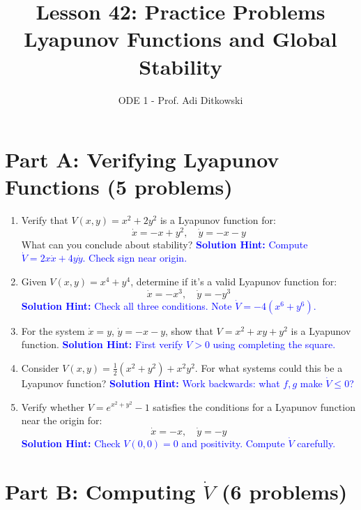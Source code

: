 \documentclass[12pt]{article}
\title{Lesson 42: Practice Problems\\
\large Lyapunov Functions and Global Stability}
\author{ODE 1 - Prof. Adi Ditkowski}
\date{}
\newcommand{\solution}[1]{\textcolor{blue}{\textbf{Solution Hint:} #1}}
\begin{document}
\maketitle

\section*{Part A: Verifying Lyapunov Functions (5 problems)}

\begin{enumerate}
\item Verify that $V(x,y) = x^2 + 2y^2$ is a Lyapunov function for:
$$\dot{x} = -x + y^2, \quad \dot{y} = -x - y$$
What can you conclude about stability?
\solution{Compute $\dot{V} = 2x\dot{x} + 4y\dot{y}$. Check sign near origin.}

\item Given $V(x,y) = x^4 + y^4$, determine if it's a valid Lyapunov function for:
$$\dot{x} = -x^3, \quad \dot{y} = -y^3$$
\solution{Check all three conditions. Note $\dot{V} = -4(x^6 + y^6)$.}

\item For the system $\dot{x} = y$, $\dot{y} = -x - y$, show that $V = x^2 + xy + y^2$ is a Lyapunov function.
\solution{First verify $V > 0$ using completing the square.}

\item Consider $V(x,y) = \frac{1}{2}(x^2 + y^2) + x^2y^2$. For what systems could this be a Lyapunov function?
\solution{Work backwards: what $f,g$ make $\dot{V} \leq 0$?}

\item Verify whether $V = e^{x^2+y^2} - 1$ satisfies the conditions for a Lyapunov function near the origin for:
$$\dot{x} = -x, \quad \dot{y} = -y$$
\solution{Check $V(0,0) = 0$ and positivity. Compute $\dot{V}$ carefully.}
\end{enumerate}

\section*{Part B: Computing $\dot{V}$ (6 problems)}
\end{document}
